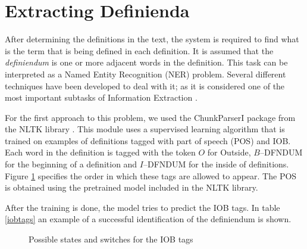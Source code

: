\documentclass[a4paper]{easychair}
\begin{document}
\section{Extracting Definienda}
After determining the definitions in the text, the system is required to find what is the term that is being defined in each definition. It is assumed that the  \emph{definiendum} is one or more adjacent words in the definition. This task can be interpreted as a Named Entity Recognition (NER) problem. Several different techniques have been developed to deal with it;  as it is considered one of the most important subtasks of Information Extraction \cite{nersurvey}.

 For the first approach to this problem, we used the ChunkParserI package from the NLTK library \cite{nltk}. This module uses a supervised learning algorithm that is trained on examples of definitions tagged with  part of speech (POS) and IOB. Each word in the definition is tagged with the token $O$ for Outside, $B$--DFNDUM for the beginning of a definition and $I$--DFNDUM for the inside of definitions. Figure \ref{iobfsm} specifies the order in which these tags are allowed to appear. The POS is obtained using the pretrained model included in the NLTK library.

After the training  is done, the model tries to predict the IOB tags. In table \ref{iobtags} an example of a successful identification of the definiendum is shown.
 \begin{figure}[h]
     \centering
{}
     \caption{\label{iobfsm} Possible states and switches for the IOB tags}
\end{figure}
\end{document}
